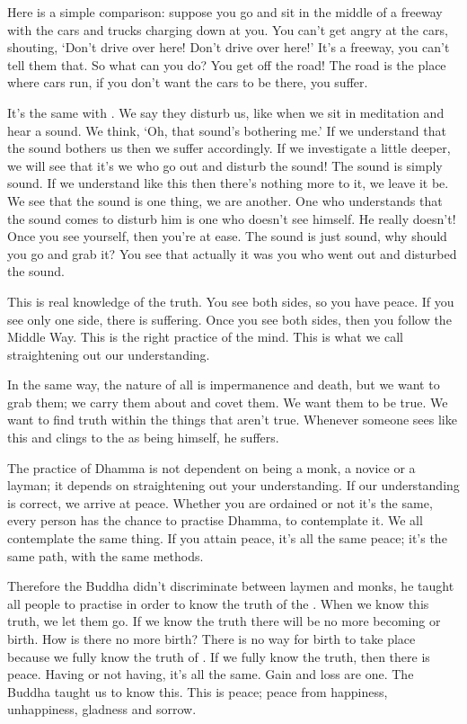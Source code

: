 Here is a simple comparison: suppose you go and sit in the middle of a freeway with the cars and trucks charging down at you. You can't get angry at the cars, shouting, `Don't drive over here! Don't drive over here!' It's a freeway, you can't tell them that. So what can you do? You get off the road! The road is the place where cars run, if you don't want the cars to be there, you suffer.

It's the same with . We say they disturb us, like when we sit in meditation and hear a sound. We think, `Oh, that sound's bothering me.' If we understand that the sound bothers us then we suffer accordingly. If we investigate a little deeper, we will see that it's we who go out and disturb the sound! The sound is simply sound. If we understand like this then there's nothing more to it, we leave it be. We see that the sound is one thing, we are another. One who understands that the sound comes to disturb him is one who doesn't see himself. He really doesn't! Once you see yourself, then you're at ease. The sound is just sound, why should you go and grab it? You see that actually it was you who went out and disturbed the sound.

This is real knowledge of the truth. You see both sides, so you have peace. If you see only one side, there is suffering. Once you see both sides, then you follow the Middle Way. This is the right practice of the mind. This is what we call straightening out our understanding.

In the same way, the nature of all  is impermanence and death, but we want to grab them; we carry them about and covet them. We want them to be true. We want to find truth within the things that aren't true. Whenever someone sees like this and clings to the  as being himself, he suffers.

The practice of Dhamma is not dependent on being a monk, a novice or a layman; it depends on straightening out your understanding. If our understanding is correct, we arrive at peace. Whether you are ordained or not it's the same, every person has the chance to practise Dhamma, to contemplate it. We all contemplate the same thing. If you attain peace, it's all the same peace; it's the same path, with the same methods.

Therefore the Buddha didn't discriminate between laymen and monks, he taught all people to practise in order to know the truth of the . When we know this truth, we let them go. If we know the truth there will be no more becoming or birth. How is there no more birth? There is no way for birth to take place because we fully know the truth of . If we fully know the truth, then there is peace. Having or not having, it's all the same. Gain and loss are one. The Buddha taught us to know this. This is peace; peace from happiness, unhappiness, gladness and sorrow.

